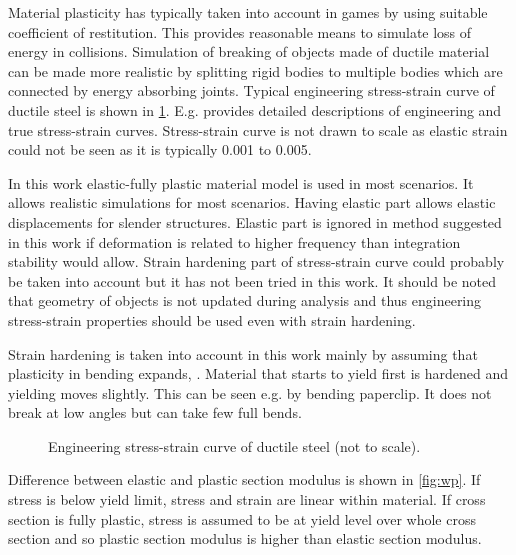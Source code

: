 Material plasticity has typically taken into account in games by using suitable coefficient of restitution.
This provides reasonable means to simulate loss of energy in collisions.
Simulation of breaking of objects made of ductile material can be made more realistic by splitting rigid bodies
to multiple bodies which are connected by energy absorbing joints.
Typical engineering stress-strain curve of ductile steel is shown in \ref{fig:sscurve}.
E.g. \citet{dowling} provides detailed descriptions of engineering and true stress-strain curves.
Stress-strain curve is not drawn to scale as elastic strain could not be seen as it is typically 0.001 to 0.005.

In this work elastic-fully plastic material model is used in most scenarios.
It allows realistic simulations for most scenarios.
Having elastic part allows elastic displacements for slender structures. 
Elastic part is ignored in method suggested in this work if deformation is related
to higher frequency than integration stability would allow.
Strain hardening part of stress-strain curve could probably be taken into account but it has not been tried in this work.
It should be noted that geometry
of objects is not updated during analysis and thus engineering stress-strain properties should
be used even with strain hardening.

Strain hardening is taken into account in this work mainly by assuming that plasticity in bending
expands, \citet[p.~672]{dowling}.
Material that starts to yield first is hardened and yielding moves slightly.
This can be seen e.g. by bending paperclip. It does not break at low angles but can take few full bends. 

\begin{figure}[htb!]
\centering
{}
\caption{Engineering stress-strain curve of ductile steel (not to scale).}
\label{fig:sscurve}
\end{figure}

Difference between elastic and plastic section modulus is shown in \ref{fig:wp}. 
If stress is below yield limit, stress and strain are linear within material.
If cross section is fully plastic, stress is assumed to be at yield level over whole cross section and 
so plastic section modulus is higher than elastic section modulus.


